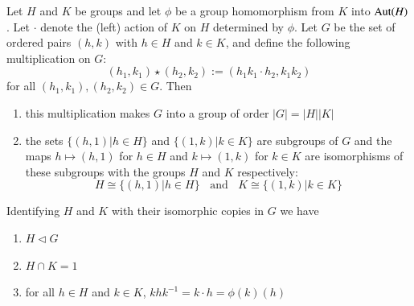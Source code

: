 \documentclass[12pt, a4paper, oneside, openright, titlepage]{book}
\begin{document}
\begin{thm}
    Let $H$ and $K$ be groups and let $\phi$ be a group homomorphism from $K$ into $\operatorname{Aut}(H)$. Let $\cdot$ denote the (left) action of $K$ on $H$ determined by $\phi$. Let $G$ be the set of ordered pairs $(h,k)$ with $h \in H$ and $k \in K$, and define the following multiplication on $G$:\begin{equation*}
        (h_1,k_1)\star(h_2,k_2) := (h_1k_1\cdot h_2,k_1k_2)
    \end{equation*}
    for all $(h_1,k_1),(h_2,k_2) \in G$. Then \begin{enumerate}
        \item this multiplication makes $G$ into a group of order $|G| = |H||K|$
        \item the sets $\{(h,1)\vert h \in H\}$ and $\{(1,k)\vert k \in K\}$ are subgroups of $G$ and the maps $h\mapsto (h,1)$ for $h \in H$ and $k \mapsto (1,k)$ for $k \in K$ are isomorphisms of these subgroups with the groups $H$ and $K$ respectively: \begin{equation*}
                H\cong \{(h,1)\vert h\in H\}\;\;\text{ and }\;\;K\cong \{(1,k)\vert k\in K\}
        \end{equation*}
    \end{enumerate}
            Identifying $H$ and $K$ with their isomorphic copies in $G$ we have \begin{enumerate}
                \item $H\vartriangleleft G$
                \item $H\cap K = 1$
                \item for all $h \in H$ and $k \in K$, $khk^{-1} = k\cdot h = \phi(k)(h)$
            \end{enumerate}
\end{thm}
\end{document}
